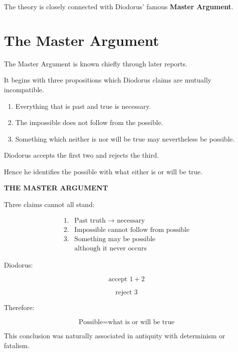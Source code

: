 \documentclass[11pt]{article}
\begin{document}
The theory is closely connected with Diodorus' famous
\textbf{Master Argument}.

\section{The Master Argument}

The Master Argument is known chiefly through later reports.

It begins with three propositions which Diodorus claims are
mutually incompatible.

\begin{enumerate}
    \item Everything that is past and true is necessary.
    \item The impossible does not follow from the possible.
    \item Something which neither is nor will be true may
    nevertheless be possible.
\end{enumerate}

Diodorus accepts the first two and rejects the third.

Hence he identifies the possible with what either is or will be
true.

\begin{whiteboard}
\textbf{THE MASTER ARGUMENT}

Three claims cannot all stand:

\[
\begin{array}{ll}
1. & \text{Past truth } \rightarrow \text{ necessary}\\[0.4em]
2. & \text{Impossible cannot follow from possible}\\[0.4em]
3. & \text{Something may be possible}\\
   & \text{although it never occurs}
\end{array}
\]

Diodorus:

\[
\text{accept }1+2
\]

\[
\text{reject }3
\]

Therefore:

\[
\boxed{
\text{Possible}
=
\text{what is or will be true}
}
\]
\end{whiteboard}

This conclusion was naturally associated in antiquity with
determinism or fatalism.

\end{document}

